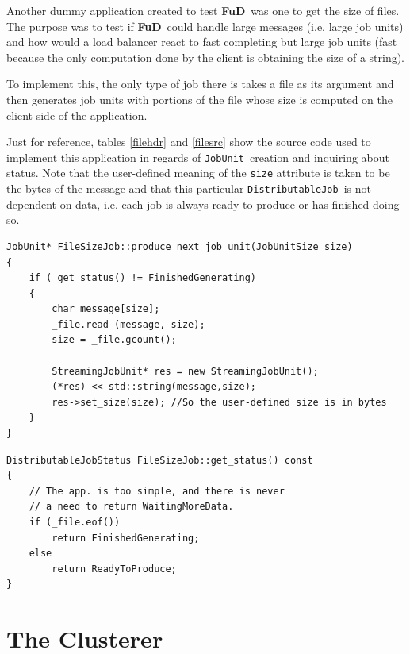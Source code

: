 \documentclass[a4paper,12pt,english]{report}
\newcommand{\fud}{\textbf{FuD}}
\renewcommand{\DJ}{\texttt{DistributableJob}}
\newcommand{\JU}{\texttt{JobUnit}}
\begin{document}
Another dummy application created to test \fud \ was one to get the size of files. The purpose was to test if \fud \ could handle large messages (i.e. large job units) and how would a load balancer react to fast completing but large job units (fast because the only computation done by the client is obtaining the size of a string).

To implement this, the only type of job there is takes a file as its argument and then generates job units with portions of the file whose size is computed on the client side of the application.

Just for reference, tables \ref{filehdr} and \ref{filesrc} show the source code used to implement this application in regards of \JU \ creation and inquiring about status. Note that the user-defined meaning of the \texttt{size} attribute is taken to be the bytes of the message and that this particular \DJ \ is not dependent on data, i.e. each job is always ready to produce or has finished doing so.

\begin{table}[!htb]
\lstset{language=C++}
\begin{lstlisting}[frame=single]
JobUnit* FileSizeJob::produce_next_job_unit(JobUnitSize size)
{
    if ( get_status() != FinishedGenerating)
    {
        char message[size];
        _file.read (message, size);
        size = _file.gcount();
        
        StreamingJobUnit* res = new StreamingJobUnit();
        (*res) << std::string(message,size);
        res->set_size(size); //So the user-defined size is in bytes
    }
}
\end{lstlisting}
\centering \caption{Creating a \JU \ for the File-Size application.} \label{filehdr}
\end{table}

\begin{table}[!htb]
\lstset{language=C++}
\begin{lstlisting}[frame=single]
DistributableJobStatus FileSizeJob::get_status() const
{
    // The app. is too simple, and there is never 
    // a need to return WaitingMoreData.
    if (_file.eof())
        return FinishedGenerating;
    else
        return ReadyToProduce;
}
\end{lstlisting}
\centering \caption{Method \texttt{get\_status()} in the File-Size application.} \label{filesrc}
\end{table}

\part{The Clusterer}\label{clusterer}
\end{document}
